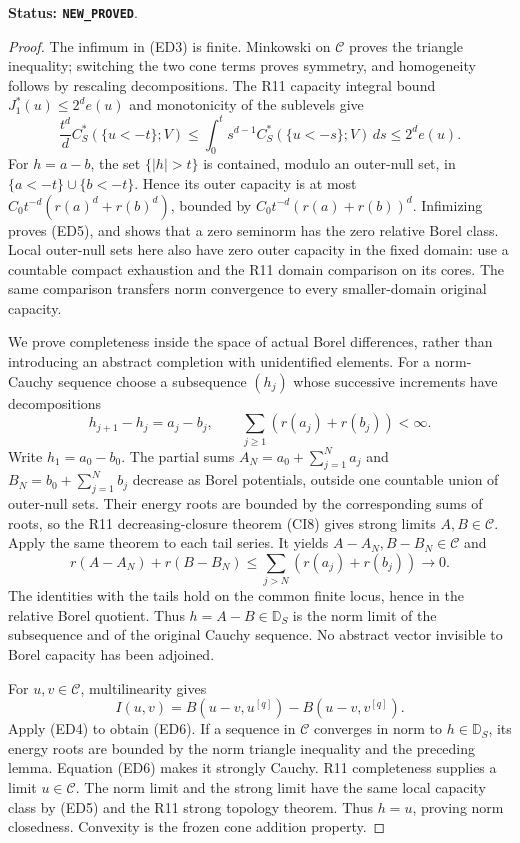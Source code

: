 \documentclass[11pt,a4paper]{article}
\numberwithin{equation}{section}
\theoremstyle{definition}
\theoremstyle{remark}
\begin{document}
\noindent\textbf{Status: \texttt{NEW\_PROVED}}.

\begin{proof}
The infimum in (ED3) is finite. Minkowski on $\mathscr C$ proves
the triangle inequality; switching the two cone terms proves
symmetry, and homogeneity follows by rescaling decompositions.
The R11 capacity integral bound $J_1^*(u)\leq2^d e(u)$ and
monotonicity of the sublevels give
\[
 \frac{t^d}{d}C_S^*(\{u<-t\};V)
       \leq\int_0^t s^{d-1}C_S^*(\{u<-s\};V)\,ds
       \leq2^d e(u).
\]
For $h=a-b$, the set $\{|h|>t\}$ is contained, modulo an
outer-null set, in $\{a<-t\}\cup\{b<-t\}$. Hence its outer
capacity is at most $C_0t^{-d}(r(a)^d+r(b)^d)$, bounded by
$C_0t^{-d}(r(a)+r(b))^d$. Infimizing proves (ED5), and shows
that a zero seminorm has the zero relative Borel class. Local
outer-null sets here also have zero outer capacity in the fixed
domain: use a countable compact exhaustion and the R11 domain
comparison on its cores. The same comparison transfers norm
convergence to every smaller-domain original capacity.

We prove completeness inside the space of actual Borel differences,
rather than introducing an abstract completion with unidentified
elements. For a norm-Cauchy sequence choose a subsequence $(h_j)$
whose successive increments have decompositions
\[
 h_{j+1}-h_j=a_j-b_j,\qquad
 \sum_{j\geq1}(r(a_j)+r(b_j))<\infty.
 \tag{ED7}
\]
Write $h_1=a_0-b_0$. The partial sums
$A_N=a_0+\sum_{j=1}^N a_j$ and
$B_N=b_0+\sum_{j=1}^N b_j$ decrease as Borel potentials,
outside one countable union of outer-null sets. Their energy
roots are bounded by the corresponding sums of roots, so the
R11 decreasing-closure theorem (CI8) gives strong limits
$A,B\in\mathscr C$. Apply the same theorem to each tail series.
It yields $A-A_N,B-B_N\in\mathscr C$ and
\[
 r(A-A_N)+r(B-B_N)
          \leq\sum_{j>N}(r(a_j)+r(b_j))\longrightarrow0.
 \tag{ED8}
\]
The identities with the tails hold on the common finite locus,
hence in the relative Borel quotient. Thus $h=A-B\in\mathbb D_S$
is the norm limit of the subsequence and of the original Cauchy
sequence. No abstract vector invisible to Borel capacity has been
adjoined.

For $u,v\in\mathscr C$, multilinearity gives
\[
 I(u,v)=B(u-v,u^{[q]})-B(u-v,v^{[q]}).
\]
Apply (ED4) to obtain (ED6). If a sequence in $\mathscr C$
converges in norm to $h\in\mathbb D_S$, its energy roots are
bounded by the norm triangle inequality and the preceding lemma.
Equation (ED6) makes it strongly Cauchy. R11 completeness supplies
a limit $u\in\mathscr C$. The norm limit and the strong limit
have the same local capacity class by (ED5) and the R11 strong
topology theorem. Thus $h=u$, proving norm closedness.
Convexity is the frozen cone addition property.
\end{proof}
\end{document}
